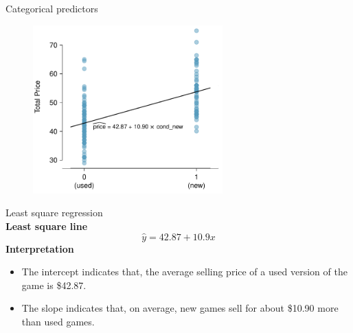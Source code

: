 \documentclass[12pt,a4paper]{beamer}
\begin{document}
\begin{frame}{Categorical predictors}
	\begin{figure}
	\centering
	\includegraphics[width=0.65\textwidth]{figures/marioKartNewUsed/marioKartNewUsed}		  \end{figure}
	\end{frame}	
	\begin{frame}{Least square regression}
		\\
		\textbf{Least square line}
		\[\hat{y}=42.87+10.9 x\]
		\textbf{Interpretation}
		\begin{itemize}
		 \item The intercept indicates that, the average selling price of a used version of the game is \$42.87.
		\item The slope indicates that, on average, new games sell for about \$10.90 more than used games.
	\end{itemize}
		\end{frame}
\end{document}
